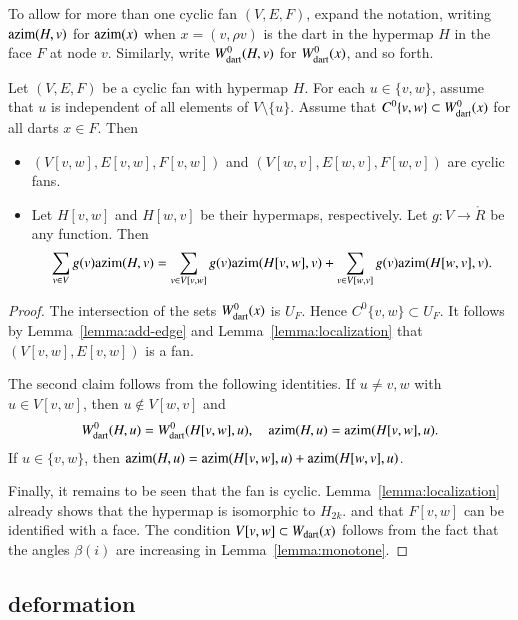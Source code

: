 To allow for more than one cyclic fan $(V,E,F)$,  expand the notation, writing ${\operatorname{azim}}(H,v)$ for ${\operatorname{azim}}(x)$ when $x=(v,\rho v)$ is the dart in the hypermap $H$ in the face $F$ at node $v$.  Similarly, write $W^0_{\text{dart}}(H,v)$ for $W^0_{\text{dart}}(x)$, and so forth.


\begin{lemma}[slicing]  Let $(V,E,F)$ be a cyclic fan with hypermap $H$.  For each $u\in \{v,w\}$, assume that $u$ is independent of all elements of $V\setminus\{u\}$.    Assume that $C^0\{v,w\}\subset W^0_{\text{dart}}(x)$ for all darts $x\in F$.  Then
\begin{itemize}
\item $(V[v,w],E[v,w],F[v,w])$ and $(V[w,v],E[w,v],F[w,v])$ are cyclic fans.  
\item Let $H[v,w]$ and $H[w,v]$ be their hypermaps, respectively.  Let $g:V\to\ring{R}$ be any function.  Then
$$
\sum_{v\in V} g(v){\operatorname{azim}}(H,v) = \sum_{v\in V[v,w]}g(v){\operatorname{azim}}(H[v,w],v) + \sum_{v\in V[w,v]}g(v){\operatorname{azim}}(H[w,v],v).
$$
\end{itemize}
\end{lemma}

\begin{proof}
The intersection of the sets $W^0_{\text{dart}}(x)$ is $U_F$.  Hence $C^0\{v,w\}\subset U_F$.
It follows by Lemma~\ref{lemma:add-edge} and Lemma~\ref{lemma:localization} that $(V[v,w],E[v,w])$ is a fan.

The second claim follows from the following identities.
If $u\ne v,w$ with $u\in V[v,w]$, then $u\not\in V[w,v]$ and 
\begin{equation}
W^0_{\text{dart}}(H,u)=W^0_{\text{dart}}(H[v,w],u),\quad {\operatorname{azim}}(H,u) = {\operatorname{azim}}(H[v,w],u).
\end{equation}
If $u\in\{v,w\}$, then 
${\operatorname{azim}}(H,u)={\operatorname{azim}}(H[v,w],u) +{\operatorname{azim}}(H[w,v],u)$.

Finally, it remains to be seen that the fan is cyclic.  Lemma~\ref{lemma:localization} already shows that the hypermap is isomorphic to $H_{2k}$. and that $F[v,w]$ can be identified with a face.  The condition $V[v,w]\subset W_{\text{dart}}(x)$ follows from the fact that the angles $\beta(i)$ are increasing in Lemma~\ref{lemma:monotone}.
\end{proof}

\subsection{deformation}

